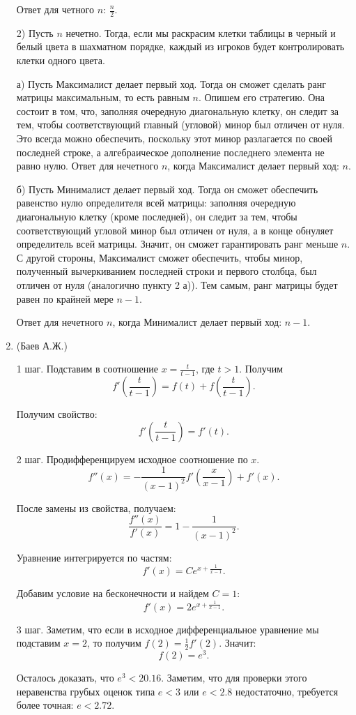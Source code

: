 \documentclass[11pt, a4paper]{article}
\begin{document}
\begin{enumerate}
Ответ для четного $n$: $\frac{n}{2}$.

2) Пусть $n$ нечетно. Тогда, если мы раскрасим клетки таблицы в черный и белый цвета в шахматном порядке, каждый из игроков будет контролировать клетки одного цвета. 

а) Пусть Максималист делает первый ход. Тогда он сможет сделать ранг матрицы максимальным, то есть равным $n$. Опишем его стратегию. Она состоит в том, что, заполняя очередную диагональную клетку, он следит за тем, чтобы соответствующий главный (угловой) минор был отличен от нуля. Это всегда можно обеспечить, поскольку этот минор разлагается по своей последней строке, а алгебраическое дополнение последнего элемента не равно нулю. 
Ответ для нечетного $n$, когда Максималист делает первый ход: $n$. 

б) Пусть Минималист делает первый ход. Тогда он сможет обеспечить равенство нулю определителя всей матрицы: заполняя очередную диагональную клетку (кроме последней), он следит за тем, чтобы соответствующий угловой минор был отличен от нуля, а в конце обнуляет определитель всей матрицы. Значит, он сможет гарантировать ранг меньше $n$. С другой стороны, Максималист сможет обеспечить, чтобы минор, полученный вычеркиванием последней строки и первого столбца, был отличен от нуля (аналогично пункту 2 а)). Тем самым, ранг матрицы будет равен по крайней мере $n-1$. 

Ответ для нечетного $n$, когда Минималист делает первый ход: $n-1$. 
 
\item (Баев А.Ж.)

1 шаг. Подставим в соотношение $x = \frac{t}{t-1}$, где $t > 1$. Получим
$$f'\left(\frac{t}{t-1}\right) = f(t) + f\left( \frac{t}{t-1} \right) .$$

Получим свойство:
$$f' \left(\frac{t}{t-1} \right) = f'(t).$$

2 шаг. Продифференцируем исходное соотношение по $x$.
$$ f''(x) = - \frac{1}{(x-1)^2} f' \left( \frac{x}{x-1} \right) + f'(x) .$$

После замены из свойства, получаем:
$$ \frac{f''(x)}{f'(x)} = 1 - \frac{1}{(x-1)^2} .$$

Уравнение интегрируется по частям:
$$ f'(x) = C e^{x + \frac{1}{x-1}}.$$

Добавим условие на бесконечности и найдем $C = 1$:
$$ f'(x) = 2 e^{x + \frac{1}{x-1}}.$$

3 шаг. Заметим, что если в исходное дифференциальное уравнение мы подставим $x = 2$, то получим $f(2) = \frac{1}{2} f'(2)$. Значит:
$$ f(2) = e^3.$$

Осталось доказать, что $e^3 < 20.16$. Заметим, что для проверки этого неравенства грубых оценок типа $e<3$ или $e<2.8$ недостаточно, требуется более точная: $e<2.72$.

\end{enumerate}
\end{document}

